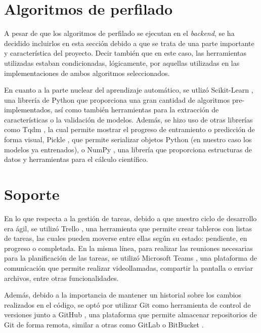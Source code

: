 \section{Algoritmos de perfilado}
\label{sec:herramientas_algoritmos}

A pesar de que los algoritmos de perfilado se ejecutan en el \textit{backend}, se ha decidido incluirlos en esta sección debido a que se trata de una parte
importante y característica del proyecto. Decir también que en este caso, las herramientas utilizadas estaban condicionadas, lógicamente,
por aquellas utilizadas en las implementaciones de ambos algoritmos seleccionados.

\bigskip
En cuanto a la parte nuclear del aprendizaje automático, se utlizó Scikit-Learn \cite{scikitlearn}, una librería de Python que proporciona una gran cantidad
de algoritmos pre-implementados, así como también herramientas para la extracción de características o la validación de modelos. Además, se hizo uso
de otras librerías como Tqdm \cite{tqdm}, la cual permite mostrar el progreso de entramiento o predicción de forma visual, Pickle \cite{pickle}, que permite
serializar objetos Python (en nuestro caso los modelos ya entrenados), o NumPy \cite{numpy}, una librería que proporciona estructuras de datos y herramientas para el cálculo científico.

\section{Soporte}
\label{sec:herramientas_soporte}

En lo que respecta a la gestión de tareas, debido a que nuestro ciclo de desarrollo era ágil, se utilizó Trello \cite{trello}, una herramienta que permite crear tableros con listas de tareas, las cuales pueden moverse
entre ellas según su estado: pendiente, en progreso o completada. En la misma línea, para realizar las reuniones necesarias para la planificación de las tareas, se utilizó Microsoft Teams \cite{teams}, una plataforma
de comunicación que permite realizar videollamadas, compartir la pantalla o enviar archivos, entre otras funcionalidades.

\bigskip
Además, debido a la importancia de mantener un historial sobre los cambios realizados en el código, se optó por utilizar Git \cite{git} como herramienta de control de versiones junto a GitHub \cite{github}, una plataforma que permite
almacenar repositorios de Git de forma remota, similar a otras como GitLab \cite{gitlab} o BitBucket \cite{bitbucket}.

